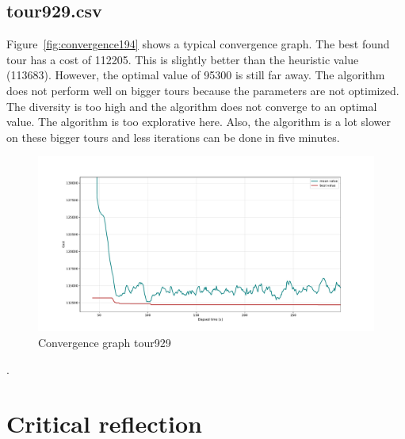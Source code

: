 \documentclass[a4paper,10pt]{article}
\newcommand{\ReplaceMe}[1]{{\color{blue}#1}}
\begin{document}
\subsection{tour929.csv}
Figure~\ref{fig:convergence194} shows a typical convergence graph. The best found tour has a cost of 112205. This is slightly better than the heuristic value (113683). However, the optimal value of 95300 is still far away. The algorithm does not perform well on bigger tours because the parameters are not optimized. The diversity is too high and the algorithm does not converge to an optimal value. The algorithm is too explorative here. Also, the algorithm is a lot slower on these bigger tours and less iterations can be done in five minutes. 
\begin{figure}[H]
  \centering
  \includegraphics[width=.8\linewidth]{img/convergence929.pdf}
  \caption{Convergence graph tour929}
  \label{fig:convergence929}
\end{figure}.







\section{Critical reflection}
\end{document}
